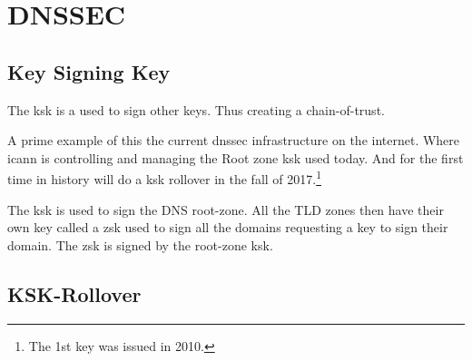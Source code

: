 \section{DNSSEC}

\subsection[KSK]{Key Signing Key}

The \gls{ksk} is a used to sign other keys. Thus creating a chain-of-trust.

A prime example of this the current \gls{dnssec} infrastructure on the internet. Where \gls{icann} is controlling and managing the Root zone \gls{ksk} used today. And for the first time in history will do a \gls{ksk} rollover in the fall of 2017.\footnote{The 1st key was issued in 2010.}

The \gls{ksk} is used to sign the DNS root-zone. All the TLD zones then have their own key called a \gls{zsk} used to sign all the domains requesting a key to sign their domain. The \gls{zsk} is signed by the root-zone \gls{ksk}.

\subsection[Rollover]{KSK-Rollover}

